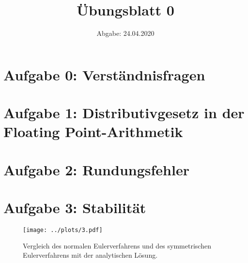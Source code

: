 

\subject{Computational Physics}
\title{Übungsblatt 0}
\date{%
  Abgabe: 24.04.2020
}



\maketitle
\thispagestyle{empty}
\newpage

\section*{Aufgabe 0: Verständnisfragen}



\section*{Aufgabe 1: Distributivgesetz in der Floating Point-Arithmetik}



\section*{Aufgabe 2: Rundungsfehler}



\section*{Aufgabe 3: Stabilität}

\begin{figure}[H]
  \centering
  \texttt{[image: ../plots/3.pdf]}
  \caption{Vergleich des normalen Eulerverfahrens und des symmetrischen Eulerverfahrens mit der analytischen Lösung.}
  \label{fig:Eulervergleich}
\end{figure}




\printbibliography{}


